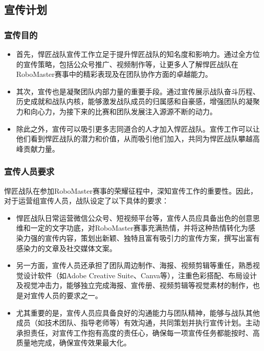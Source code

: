 \subsection{宣传计划}
    
    \subsubsection{宣传目的}


        \begin{itemize}
            \item 首先，悍匠战队宣传工作立足于提升悍匠战队的知名度和影响力。通过全方位的宣传策略，包括公众号推广、视频制作等，让更多人了解悍匠战队在RoboMaster赛事中的精彩表现及在团队协作方面的卓越能力。
            \item 其次，宣传也是凝聚团队内部力量的重要手段。通过宣传展示战队奋斗历程、历史成就和战队内核，能够激发战队成员的归属感和自豪感，增强团队的凝聚力和向心力，为接下来的比赛和团队发展注入源源不断的动力。
            \item 除此之外，宣传可以吸引更多志同道合的人才加入悍匠战队。宣传工作可以让他们看到悍匠战队的潜力和价值，从而吸引他们加入，共同为悍匠战队攀越高峰贡献力量。
        \end{itemize}

    \subsubsection{宣传人员要求}

        悍匠战队在参加RoboMaster赛事的荣耀征程中，深知宣传工作的重要性。因此，对于运营组宣传人员，战队设定了以下具体的要求：


        \begin{itemize}
            \item 悍匠战队日常运营微信公众号、短视频平台等，宣传人员应具备出色的创意思维和一定的文字功底，对RoboMaster赛事充满热情，并将这种热情转化为感染力强的宣传内容，策划出新颖、独特且富有吸引力的宣传方案，撰写出富有感染力的文章及社交媒体文案。
            \item 另一方面，宣传人员还承担了团队周边制作、海报、视频剪辑等重任，熟悉视觉设计软件（如Adobe Creative Suite、Canva等），注重色彩搭配、布局设计及视觉冲击力，能够独立完成海报、宣传册、视频剪辑等视觉素材的制作，也是对宣传人员的要求之一。
            \item 尤其重要的是，宣传人员应具备良好的沟通能力与团队精神，能够与战队其他成员（如技术团队、指导老师等）有效沟通，共同策划并执行宣传计划。主动承担责任，对宣传工作抱有高度的责任心，确保每一项宣传任务都能按时、高质量地完成，确保宣传效果最大化。
        \end{itemize}

